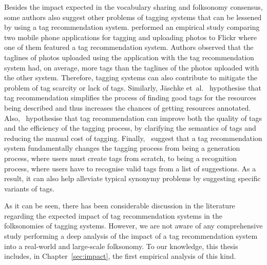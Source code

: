 Besides the impact expected in the vocabulary sharing and folksonomy consensus, some authors also suggest other problems of tagging systems that can be lessened by using a tag recommendation system.
\cite{Naaman2008} performed an empirical study comparing two mobile phone applications for tagging and uploading photos to Flickr where one of them featured a tag recommendation system. Authors observed that the taglines of photos uploaded using the application with the tag recommendation system had, on average, more tags than the taglines of the photos uploaded with the other system. Therefore, tagging systems can also contribute to mitigate the problem of tag scarcity or lack of tags.
Similarly, J\"{a}schke et~al.~\citeyearpar{jaske2007,Jaschke2012} hypothesise that tag recommendation simplifies the process of finding good tags for the resources being described and thus increases the chances of getting resources annotated. Also,~\cite{Wang2012} hypothesise that tag recommendation can improve both the quality of tags and the efficiency of the tagging process, by clarifying the semantics of tags and reducing the manual cost of tagging.
Finally,~\cite{Sood2007} suggest that a tag recommendation system fundamentally changes the tagging process from being a generation process, where users must create tags from scratch, to being a recognition process, where users have to recognise valid tags from a list of suggestions. As a result, it can also help alleviate typical synonymy problems by suggesting specific variants of tags.

As it can be seen, there has been considerable discussion in the literature regarding the expected impact of tag recommendation systems in the folksonomies of tagging systems.
However, we are not aware of any comprehensive study performing a deep analysis of the impact of a tag recommendation system into a real-world and large-scale folksonomy.
To our knowledge, this thesis includes, in Chapter~\ref{sec:impact}, the first empirical analysis of this kind.




